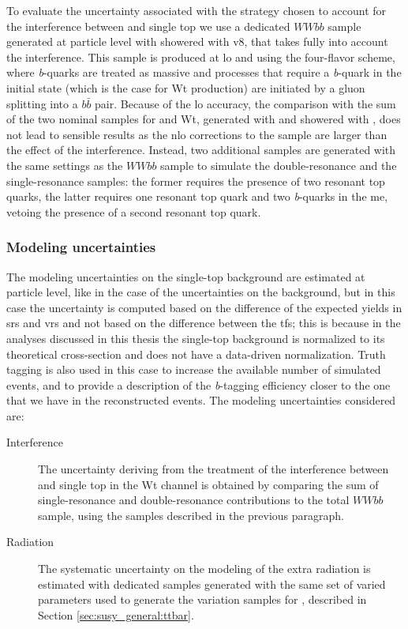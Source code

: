 To evaluate the uncertainty associated with the strategy chosen to account for the interference between \ttbar and single top
we use a dedicated $WWbb$ sample generated at particle level with \aNLO showered with \PY v8, that takes fully into account the interference.
This sample is produced at \gls{lo} and using the four-flavor scheme, where \textit{b}-quarks are treated as massive and processes that require a \textit{b}-quark in the initial state (which is the case for Wt production) are initiated by a gluon splitting into a $b\bar{b}$ pair. 
Because of the \gls{lo} accuracy, the comparison with the sum of the two nominal samples for \ttbar and Wt, generated with \PowhegBox and showered with \PY, does not lead to sensible 
results as the \gls{nlo} corrections to the \ttbar sample are larger than the effect of the interference. 
Instead, two additional samples are generated with the same settings as the $WWbb$ sample to simulate the double-resonance and the single-resonance samples: the former requires the presence of two resonant top quarks, the latter requires one resonant top quark and two \textit{b}-quarks in the \gls{me}, vetoing the presence of a second resonant top quark.  


\subsubsection*{Modeling uncertainties}

The modeling uncertainties on the single-top background are estimated at particle level, 
like in the case of the uncertainties on the \ttbar background, but in this case the uncertainty is computed based on the difference of the expected yields in \glspl{sr} and \glspl{vr} and not based on the difference between the \glspl{tf}; 
this is because in the analyses discussed in this thesis the single-top background is normalized to its theoretical cross-section and does not have a data-driven normalization. Truth tagging is also used in this case to 
increase the available number of simulated events,  
and to provide a description of the \textit{b}-tagging efficiency closer to the one that we have in the reconstructed events. The modeling uncertainties considered are: 

\begin{description}
\item[Interference] The uncertainty deriving from the treatment of the interference between \ttbar and single top in the Wt channel is obtained by  comparing the sum of single-resonance and double-resonance contributions to the total $WWbb$ sample, using the samples described in the previous paragraph.

\item[Radiation] The systematic uncertainty on the modeling of the extra radiation is estimated with dedicated samples generated with the same set of varied parameters used to generate the variation samples for \ttbar, described in Section \ref{sec:susy_general:ttbar}. 

\end{description}

